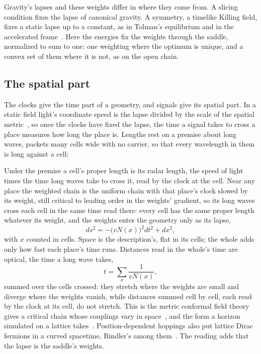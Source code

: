\documentclass[aps,prd,reprint,superscriptaddress]{revtex4-2}
\begin{document}
Gravity's lapses and these weights differ in where they come from. A slicing condition fixes the lapse of canonical gravity. A symmetry, a timelike Killing field, fixes a static lapse up to a constant, as in Tolman's equilibrium and in the accelerated frame~\cite{Tolman1930,BisognanoWichmann1976}. Here the energies fix the weights through the saddle, normalized to sum to one: one weighting where the optimum is unique, and a convex set of them where it is not, as on the open chain.

\subsection{The spatial part}
\label{sec:readings-space}

The clocks give the time part of a geometry, and signals give its spatial part. In a static field light's coordinate speed is the lapse divided by the scale of the spatial metric~\cite{Gourgoulhon2007}, so once the clocks have fixed the lapse, the time a signal takes to cross a place measures how long the place is. Lengths rest on a premise about long waves, packets many cells wide with no carrier, so that every wavelength in them is long against a cell:


Under the premise a cell's proper length is its radar length, the speed of light times the time long waves take to cross it, read by the clock at the cell. Near any place the weighted chain is the uniform chain with that place's clock slowed by its weight, still critical to leading order in the weights' gradient, so its long waves cross each cell in the same time read there: every cell has the same proper length whatever its weight, and the weights enter the geometry only as its lapse,
\begin{equation*}
  ds^2 = -\big(vN(x)\big)^2 dt^2 + dx^2 ,
\end{equation*}
with $x$ counted in cells. Space is the description's, flat in its cells; the whole adds only how fast each place's time runs. Distances read in the whole's time are optical, the time a long wave takes,
\begin{equation}
  t = \sum_x \frac{1}{vN(x)} ,
  \label{eq:optical}
\end{equation}
summed over the cells crossed: they stretch where the weights are small and diverge where the weights vanish, while distances summed cell by cell, each read by the clock at its cell, do not stretch. This is the metric conformal field theory gives a critical chain whose couplings vary in space~\cite{DubailEtAl2017}, and the form a horizon simulated on a lattice takes~\cite{RodriguezLagunaEtAl2017}. Position-dependent hoppings also put lattice Dirac fermions in a curved spacetime, Rindler's among them~\cite{BoadaEtAl2011}. The reading adds that the lapse is the saddle's weights.
\end{document}
